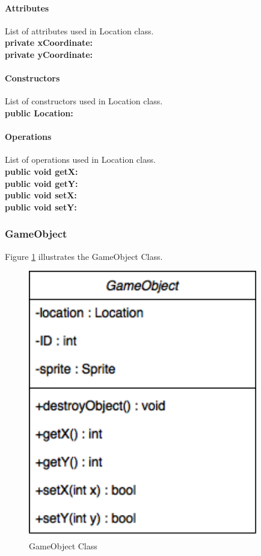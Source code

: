 \documentclass[12pt]{article} %
\begin{document}
\paragraph{Attributes\\}

List of attributes used in Location class.\\
\textbf{private xCoordinate:} \\
\textbf{private yCoordinate:} 


\paragraph{Constructors \\}
List of constructors used in Location class.\\
\textbf{public Location:} 

\paragraph{Operations \\}
List of operations used in Location class.\\
\textbf{public void getX:}  \\
\textbf{public void getY:}  \\
\textbf{public void setX:}  \\
\textbf{public void setY:}  




\subsubsection{GameObject} %

Figure \ref{fig:gameobject} illustrates the GameObject Class.
\begin{figure}[h!]
   \centering
   \vspace{10pt}%
   \includegraphics[width=10cm]{gameobject.png}
   \caption{GameObject Class}
   \label{fig:gameobject}
\end{figure}
\end{document}
